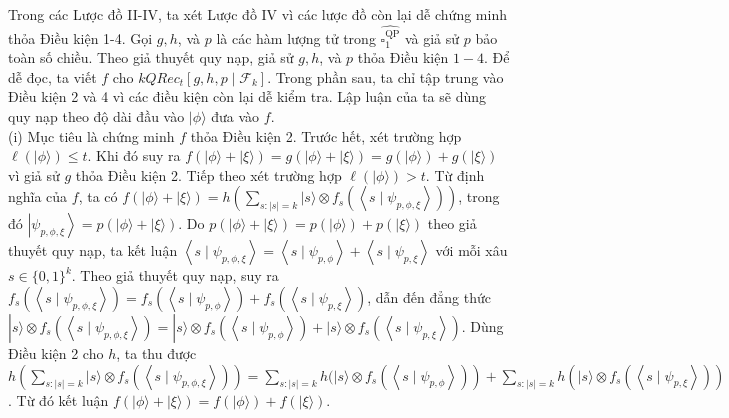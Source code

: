 \documentclass[10pt]{article}
\begin{document}
Trong các Lược đồ II-IV, ta xét Lược đồ IV vì các lược đồ còn lại dễ chứng minh thỏa Điều kiện 1-4. Gọi $g, h$, và $p$ là các hàm lượng tử trong $\widehat{\square_{1}^{\mathrm{QP}}}$ và giả sử $p$ bảo toàn số chiều. Theo giả thuyết quy nạp, giả sử $g, h$, và $p$ thỏa Điều kiện $1-4$. Để dễ đọc, ta viết $f$ cho $k Q R e c_{t}\left[g, h, p \mid \mathcal{F}_{k}\right]$. Trong phần sau, ta chỉ tập trung vào Điều kiện 2 và 4 vì các điều kiện còn lại dễ kiểm tra. Lập luận của ta sẽ dùng quy nạp theo độ dài đầu vào $|\phi\rangle$ đưa vào $f$.\\
(i) Mục tiêu là chứng minh $f$ thỏa Điều kiện 2. Trước hết, xét trường hợp $\ell(|\phi\rangle) \leq t$. Khi đó suy ra $f(|\phi\rangle+|\xi\rangle)=g(|\phi\rangle+|\xi\rangle)=g(|\phi\rangle)+g(|\xi\rangle)$ vì giả sử $g$ thỏa Điều kiện 2. Tiếp theo xét trường hợp $\ell(|\phi\rangle)>t$. Từ định nghĩa của $f$, ta có $f(|\phi\rangle+|\xi\rangle)=h\left(\sum_{s:|s|=k}|s\rangle \otimes f_{s}\left(\left\langle s \mid \psi_{p, \phi, \xi}\right\rangle\right)\right)$, trong đó $\left|\psi_{p, \phi, \xi}\right\rangle=p(|\phi\rangle+|\xi\rangle)$. Do $p(|\phi\rangle+|\xi\rangle)=p(|\phi\rangle)+p(|\xi\rangle)$ theo giả thuyết quy nạp, ta kết luận $\left\langle s \mid \psi_{p, \phi, \xi}\right\rangle=\left\langle s \mid \psi_{p, \phi}\right\rangle+\left\langle s \mid \psi_{p, \xi}\right\rangle$ với mỗi xâu $s \in\{0,1\}^{k}$. Theo giả thuyết quy nạp, suy ra $f_{s}\left(\left\langle s \mid \psi_{p, \phi, \xi}\right\rangle\right)=f_{s}\left(\left\langle s \mid \psi_{p, \phi}\right\rangle\right)+f_{s}\left(\left\langle s \mid \psi_{p, \xi}\right\rangle\right)$, dẫn đến đẳng thức $|s\rangle \otimes f_{s}\left(\left\langle s \mid \psi_{p, \phi, \xi}\right\rangle\right)=|s\rangle \otimes f_{s}\left(\left\langle s \mid \psi_{p, \phi}\right\rangle\right)+ |s\rangle \otimes f_{s}\left(\left\langle s \mid \psi_{p, \xi}\right\rangle\right)$. Dùng Điều kiện 2 cho $h$, ta thu được $h\left(\sum_{s:|s|=k}|s\rangle \otimes f_{s}\left(\left\langle s \mid \psi_{p, \phi, \xi}\right\rangle\right)\right)=\sum_{s:|s|=k} h(|s\rangle \otimes \left.f_{s}\left(\left\langle s \mid \psi_{p, \phi}\right\rangle\right)\right)+\sum_{s:|s|=k} h\left(|s\rangle \otimes f_{s}\left(\left\langle s \mid \psi_{p, \xi}\right\rangle\right)\right)$. Từ đó kết luận $f(|\phi\rangle+|\xi\rangle)=f(|\phi\rangle)+f(|\xi\rangle)$.\\
\end{document}
